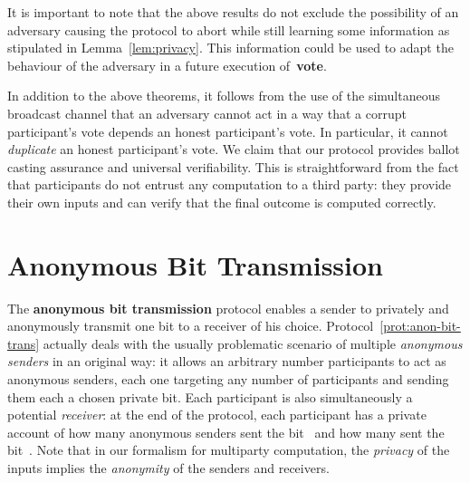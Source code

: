 \documentclass[11pt]{article}
\begin{document}
It is important to note that the above results do not exclude the
possibility of an  adversary causing the protocol to abort while
still learning some information as stipulated in
Lemma~\ref{lem:privacy}. This information could be used to adapt the
behaviour of the adversary in a future execution of~\textbf{vote}.

In addition to the above theorems, it follows from the use of the
simultaneous broadcast channel that an adversary cannot act in a way
that a corrupt participant's vote depends an honest participant's
vote. In particular, it cannot \emph{duplicate} an honest
participant's vote. We claim that our protocol provides ballot
casting assurance and universal verifiability. This is
straightforward from the fact that participants do not entrust any
computation to a third party: they provide their own inputs and can
verify that the final outcome is computed correctly.




\section{Anonymous Bit Transmission}
\label{sec:anonymous bit transmission}


The \textbf{anonymous bit transmission} protocol enables a sender to
privately and anonymously transmit one bit to a receiver of his
choice. Protocol~\ref{prot:anon-bit-trans} actually deals with the
usually problematic scenario of multiple \emph{anonymous senders} in
an original way: it allows an arbitrary number participants to act
as anonymous senders, each one targeting any number of participants
and sending them each a chosen private bit.  Each participant is
also simultaneously a potential \emph{receiver}: at the end of the
protocol, each participant has a private account of how many
anonymous senders sent the bit~ and how many sent the bit~.
Note that in our formalism for multiparty computation, the
\emph{privacy }of the inputs implies the \emph{anonymity} of the
senders and receivers.
\end{document}

